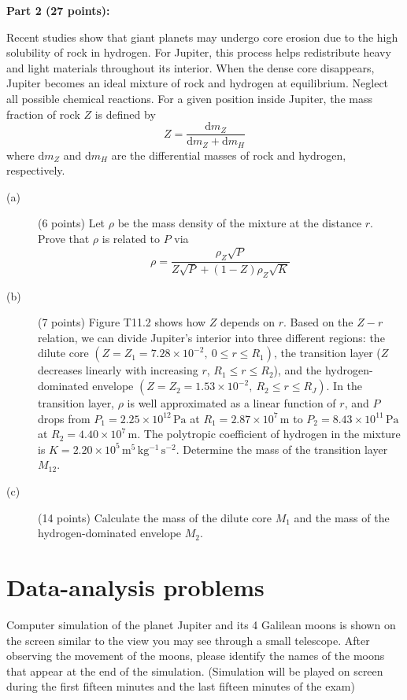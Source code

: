 \medskip\noindent\textbf{Part 2 (27 points):}

Recent studies show that giant planets may undergo core erosion due to the
high solubility of rock in hydrogen. For Jupiter, this process helps
redistribute heavy and light materials throughout its interior. When the dense
core disappears, Jupiter becomes an ideal mixture of rock and hydrogen at
equilibrium. Neglect all possible chemical reactions. For a given position
inside Jupiter, the mass fraction of rock $Z$ is defined by
\[ Z = \frac{\mathrm{d}m_Z}{\mathrm{d}m_Z + \mathrm{d}m_H} \]
where $\mathrm{d}m_Z$ and $\mathrm{d}m_H$ are the differential masses of rock
and hydrogen, respectively.

\begin{description}
\item[(a)] (6 points) Let $\rho$ be the mass density of the mixture at the
  distance $r$. Prove that $\rho$ is related to $P$ via
  \[ \rho = \frac{\rho_Z\sqrt{P}}{Z\sqrt{P} + (1 - Z)\rho_Z\sqrt{K}} \]
\item[(b)] (7 points) Figure T11.2 shows how $Z$ depends on $r$. Based on the
  $Z - r$ relation, we can divide Jupiter's interior into three different
  regions: the dilute core $(Z = Z_1 = 7.28 \times 10^{-2},\ 0 \le r \le R_1)$,
  the transition layer ($Z$ decreases linearly with increasing $r$,
  $R_1 \le r \le R_2$), and the hydrogen-dominated envelope
  $(Z = Z_2 = 1.53 \times 10^{-2},\ R_2 \le r \le R_J)$. In the transition
  layer, $\rho$ is well approximated as a linear function of $r$, and $P$
  drops from $P_1 = 2.25 \times 10^{12}\,\mathrm{Pa}$ at
  $R_1 = 2.87 \times 10^{7}\,\mathrm{m}$ to
  $P_2 = 8.43 \times 10^{11}\,\mathrm{Pa}$ at
  $R_2 = 4.40 \times 10^{7}\,\mathrm{m}$. The polytropic coefficient of
  hydrogen in the mixture is
  $K = 2.20 \times 10^{5}\,\mathrm{m^5\,kg^{-1}\,s^{-2}}$. Determine the mass
  of the transition layer $M_{12}$.


\item[(c)] (14 points) Calculate the mass of the dilute core $M_1$ and the
  mass of the hydrogen-dominated envelope $M_2$.
\end{description}

\section*{Data-analysis problems}

Computer simulation of the planet Jupiter and its 4 Galilean moons is shown
on the screen similar to the view you may see through a small telescope.
After observing the movement of the moons, please identify the names of the
moons that appear at the end of the simulation. (Simulation will be played on
screen during the first fifteen minutes and the last fifteen minutes of the
exam)

